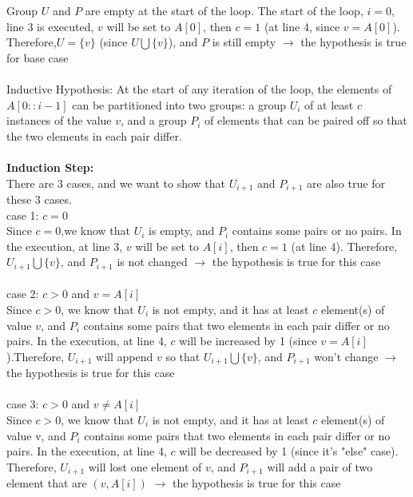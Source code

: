 \documentclass[11pt]{article}
\newenvironment{qparts}{\begin{enumerate}[{(}a{)}]}{\end{enumerate}}
\begin{document}
\begin{qparts}
Group $U$ and $P$ are empty at the start of the loop. The start of the loop, $i = 0$, line 3 is executed, $v$ will be set to $A[0]$, then $c = 1$ (at line 4, since $v = A[0]$). Therefore,$U = \{v\}$ (since $U \bigcup \{v\}$), and $P$ is still empty  $\to$ the hypothesis is true for base case\\\\

\Large{Inductive Hypothesis:}
At the start of any iteration of the loop, the elements of $A[0::i-1]$ can be partitioned into two groups: a group $U_i$ of at least $c$ instances of the value $v$, and a group $P_i$ of elements that can be paired off so that the two elements in each pair differ.\\\\
\textbf{\Large{Induction Step:}}\\
There are 3 cases, and we want to show that $U_{i+1}$ and $P_{i+1}$ are also true for these 3 cases.\\
\Large{case 1: $c = 0$}\\
\newcommand{\tab}{\hspace*{2em}}
\tab Since $c = 0$,we know that $U_i$ is empty, and $P_i$ contains some pairs or no pairs. In the execution, at line 3, $v$ will be set to $A[i]$, then $c = 1$ (at line 4). Therefore, $U_{i + 1} \bigcup \{v\}$, and $P_{i+1}$ is not changed $\to$ the hypothesis is true for this case\\\\
\Large{case 2: $c > 0$ and $v = A[i]$}\\
\tab Since $c > 0$, we know that $U_i$ is not empty, and it has at least $c$ element(s) of value $v$, and $P_i$ contains some pairs that two elements in each pair differ or no pairs.
In the execution, at line 4, $c$ will be increased by 1 (since $v =A[i]$).Therefore, $U_{i+1}$ will append $v$ so that $U_{i+1} \bigcup \{v\}$, and $P_{i+1}$ won't change $\to$ the hypothesis is true for this case\\\\
\Large{case 3: $c > 0$ and $v \neq A[i]$}\\
\tab Since $c > 0$, we know that $U_i$ is not empty, and it has at least $c$ element(s) of value v, and $P_i$ contains some pairs that two elements in each pair differ or no pairs.
In the execution, at line 4, $c$ will be decreased by 1 (since it's "else" case). Therefore, $U_{i+1}$ will lost one element of $v$, and $P_{i+1}$ will add a pair of two element that are $(v,A[i])$ $\to$ the hypothesis is true for this case\\\\



\end{qparts}
\end{document}
